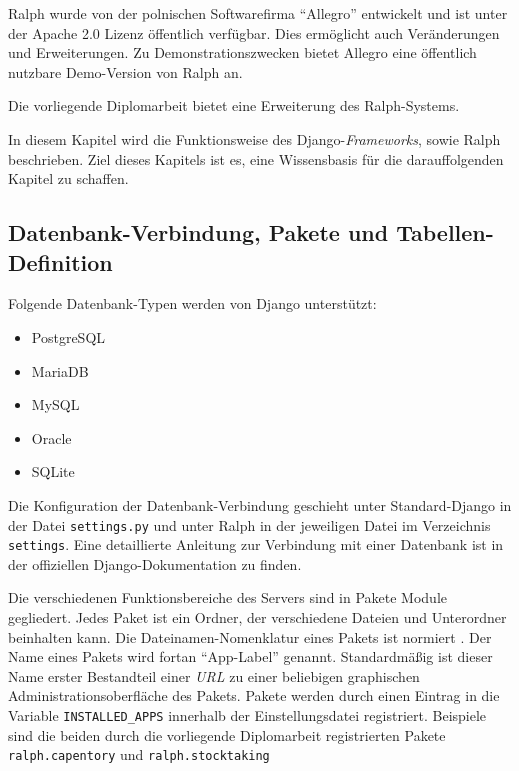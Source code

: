 Ralph wurde von der polnischen Softwarefirma ``Allegro'' entwickelt und
ist unter der Apache 2.0 Lizenz öffentlich verfügbar. Dies ermöglicht
auch Veränderungen und Erweiterungen. Zu Demonstrationszwecken bietet
Allegro eine öffentlich nutzbare Demo-Version \cite{ralph-demo} von
Ralph an.

Die vorliegende Diplomarbeit bietet eine Erweiterung des Ralph-Systems.

In diesem Kapitel wird die Funktionsweise des
Django-\emph{Frameworks},
sowie Ralph beschrieben. Ziel dieses Kapitels ist es, eine Wissensbasis
für die darauffolgenden Kapitel zu schaffen.

\hypertarget{datenbank-verbindung-pakete-und-tabellen-definition}{%
\subsection{Datenbank-Verbindung, Pakete und
Tabellen-Definition}\label{datenbank-verbindung-pakete-und-tabellen-definition}}

Folgende Datenbank-Typen werden von Django unterstützt:

\begin{itemize}
\tightlist
\item
  PostgreSQL
\item
  MariaDB
\item
  MySQL
\item
  Oracle
\item
  SQLite
\end{itemize}

Die Konfiguration der Datenbank-Verbindung geschieht unter
Standard-Django in der Datei \texttt{settings.py} und unter Ralph in der
jeweiligen Datei im Verzeichnis \texttt{settings}. Eine detaillierte
Anleitung zur Verbindung mit einer Datenbank ist in der offiziellen
Django-Dokumentation \cite{django-doku-db} zu finden.

Die verschiedenen Funktionsbereiche des Servers sind in Pakete \bzw{}
Module gegliedert. Jedes Paket ist ein Ordner, der verschiedene Dateien
und Unterordner beinhalten kann. Die Dateinamen-Nomenklatur eines Pakets
ist normiert \cite{django-file-nomenklatur}. Der Name eines Pakets wird
fortan ``App-Label'' genannt. Standardmäßig ist dieser Name erster
Bestandteil einer \emph{URL}
 zu einer beliebigen
graphischen Administrationsoberfläche des Pakets. Pakete werden durch
einen Eintrag in die Variable \texttt{INSTALLED\_APPS} innerhalb der
\oa{} Einstellungsdatei registriert. Beispiele sind die beiden durch die
vorliegende Diplomarbeit registrierten Pakete \texttt{ralph.capentory}
und \texttt{ralph.stocktaking}

